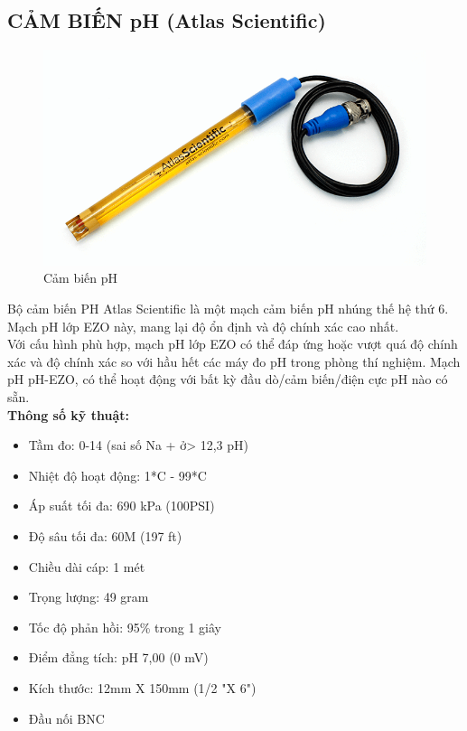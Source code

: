 \subsection{CẢM BIẾN pH (Atlas Scientific)}
\begin{figure}[H]
	\centering
	\includegraphics[scale=.4]{Chapter 3/image chapter 3/pHSensor.png}
	\caption[Cảm biến pH]{Cảm biến pH}
\end{figure}
Bộ cảm biến PH Atlas Scientific là một mạch cảm biến pH nhúng thế hệ thứ 6. Mạch pH lớp EZO này, mang lại độ ổn định và độ chính xác cao nhất.\\
\indent Với cấu hình phù hợp, mạch pH lớp EZO có thể đáp ứng hoặc vượt quá độ chính xác và độ chính xác so với hầu hết các máy đo pH trong phòng thí nghiệm. Mạch pH pH-EZO, có thể hoạt động với bất kỳ đầu dò/cảm biến/điện cực pH nào có sẵn.\\
\indent \textbf{Thông số kỹ thuật:}
\begin{itemize}
	\item Tầm đo: 0-14 (sai số Na + ở> 12,3 pH)
	\item Nhiệt độ hoạt động: 1*C - 99*C
	\item Áp suất tối đa: 690 kPa (100PSI)
	\item Độ sâu tối đa: 60M (197 ft)
	\item Chiều dài cáp: 1 mét
	\item Trọng lượng: 49 gram
	\item Tốc độ phản hồi: 95\% trong 1 giây
	\item Điểm đẳng tích: pH 7,00 (0 mV)
	\item Kích thước: 12mm X 150mm (1/2 "X 6")
	\item Đầu nối BNC 
\end{itemize}
